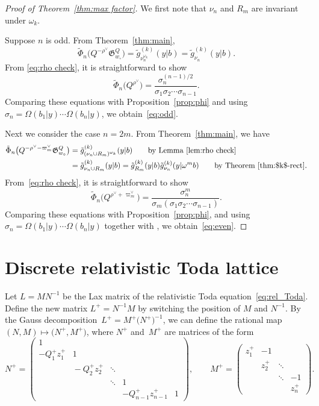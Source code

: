 \documentclass[10pt,a4paper]{amsart}
\numberwithin{equation}{section}
\newcommand{\co}{\xi}
\theoremstyle{definition}
\begin{document}
\begin{proof}[Proof of Theorem~\ref{thm:max factor}]
We first note that $\nu_n$
and $R_m$ are invariant under $\omega_k$.

Suppose $n$ is odd.
From Theorem~\ref{thm:main},
\[
\tilde{\Phi}_n\bigl(Q^{-\rho^\lor}\mathfrak{G}_{w_\circ}^Q\bigr)=\tilde{g}_{\nu_n^{\omega_k}}^{(k)}(y|b)=
\tilde{g}_{\nu_n}^{(k)}(y|b).
\]
From
\eqref{eq:rho check}, it is straightforward to show
\[
\tilde{\Phi}_n\bigl(Q^{\rho^\lor}\bigr)=
\frac{\sigma_{n}^{(n-1)/2}}{\sigma_1\sigma_2\cdots \sigma_{n-1}}.
\]
Comparing these equations with
Proposition~\ref{prop:phi}
and using
$\sigma_n=\Omega(b_1|y)\cdots\Omega(b_n|y)$, we obtain~\eqref{eq:odd}.

Next we consider the case
$n=2m$. From Theorem~\ref{thm:main}, we have
\begin{align*}
\tilde{\Phi}_n
\bigl(Q^{-\rho^\lor-\varpi_m^\lor}
\mathfrak{G}_{w_\circ}^Q\bigr)
&=\tilde{g}^{(k)}_{(\nu_n\cup R_m)^{\omega_k}}(y|b)\qquad \text{by Lemma~\ref{lem:rho check}}\\
&=\tilde{g}_{\nu_n\cup R_m}^{(k)}(y|b)=\tilde{g}^{(k)}_{R_m}(y|b)\tilde{g}^{(k)}_{\nu_n}(y|\omega^m b)\qquad\text{by Theorem~\ref{thm:$k$-rect}.}
\end{align*}
From~\eqref{eq:rho check}, it is straightforward to show
\[
\tilde{\Phi}_n\bigl(Q^{\rho^\lor+\varpi_m^\lor}\bigr)=
\frac{\sigma_{n}^m}{\sigma_m(\sigma_1\sigma_2\cdots \sigma_{n-1})}.
\]
Comparing these equations with
Proposition~\ref{prop:phi}, and
using $\sigma_n=\Omega(b_1|y)\cdots\Omega(b_n|y)$ together with
\smash{$\tilde{g}_{R_m}^{(k)}(y|b)=\sigma_m/\co_{R_m}(y)$}, we obtain~\eqref{eq:even}.
\end{proof}

\appendix

\section{Discrete relativistic Toda lattice}\label{sec:Hirotas_bilinear_form}

Let $L=MN^{-1}$ be the Lax matrix of the relativistic Toda equation~\eqref{eq:rel_Toda}.
Define the new matrix $L^+=N^{-1}M$ by switching the position of $M$ and $N^{-1}$.
By the Gauss decomposition~${L^+=M^+\bigl(N^+\bigr)^{-1}}$, we can define the rational map $(N,M)\mapsto \bigl(N^+,M^+\bigr)$, where $N^+$ and~$M^+$ are matrices of the form
\[
N^+=
\begin{pmatrix}
1& \\
-Q^+_1z^+_1 & 1\\
 & \!\!-Q^+_2z^+_2 & \ddots\\
 & & \ddots & 1\\
 & & & -Q^+_{n-1}z^+_{n-1} &1
\end{pmatrix},\qquad
M^+=
\begin{pmatrix}
z^+_1& -1\\
 & z^+_2 &\ddots\\
 & & \ddots & -1\\
 & & & z^+_n
\end{pmatrix}.
\]
\end{document}
